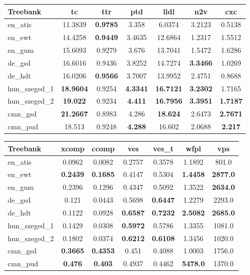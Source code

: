 \begin{table*}
\centering
\begin{tabularx}{\textwidth}{Xcccccc}
\hline
\textbf{Treebank} & \textbf{tc} & \textbf{ttr} & \textbf{ptd} & \textbf{lldl} & \textbf{n2v} & \textbf{cxc} \\
\hline
en\_atis & 11.3839 & \textbf{0.9785} & 3.358 & 6.0374 & 3.2123 & 0.5138 \\
\hline
en\_ewt & 14.4258 & \textbf{0.9449} & 3.4635 & 12.6864 & 1.2317 & 1.5512 \\
\hline
en\_gum & 15.6093 & 0.9279 & 3.676 & 13.7041 & 1.5472 & 1.6286 \\
\hline
de\_gsd & 16.6016 & 0.9436 & 3.8252 & 14.7274 & \textbf{3.3466} & 1.0269 \\
\hline
de\_hdt & 16.0206 & \textbf{0.9566} & 3.7007 & 13.9952 & 2.4751 & 0.8688 \\
\hline
hun\_szeged\_1 & \textbf{18.9604} & 0.9254 & \textbf{4.3341} & \textbf{16.7121} & \textbf{3.2302} & 1.7165 \\
\hline
hun\_szeged\_2 & \textbf{19.022} & 0.9234 & \textbf{4.411} & \textbf{16.7956} & \textbf{3.3951} & \textbf{1.7187} \\
\hline
cmn\_gsd & \textbf{21.2667} & 0.8983 & 4.286 & \textbf{18.624} & 2.6473 & \textbf{2.7671} \\
\hline
cmn\_pud & 18.513 & 0.9248 & \textbf{4.288} & 16.602 & 2.0688 & \textbf{2.217} \\
\hline
\end{tabularx}

\vspace{0.5cm}

\begin{tabularx}{\textwidth}{Xcccccc}
\hline
\textbf{Treebank} & \textbf{xcomp} & \textbf{ccomp} & \textbf{ves} & \textbf{ves\_t} & \textbf{wfpl} & \textbf{vps} \\
\hline
en\_atis & 0.0962 & 0.0082 & 0.2757 & 0.3578 & 1.1892 & 801.0 \\
\hline
en\_ewt & \textbf{0.2439} & \textbf{0.1685} & 0.4147 & 0.5304 & \textbf{1.4458} & \textbf{2877.0} \\
\hline
en\_gum & 0.2396 & 0.1296 & 0.4347 & 0.5092 & 1.3522 & \textbf{2634.0} \\
\hline
de\_gsd & 0.121 & 0.0443 & 0.5698 & \textbf{0.6447} & 1.2279 & 2293.0 \\
\hline
de\_hdt & 0.1122 & 0.0928 & \textbf{0.6587} & \textbf{0.7232} & \textbf{2.5082} & \textbf{2685.0} \\
\hline
hun\_szeged\_1 & 0.1429 & 0.0308 & \textbf{0.5972} & 0.5786 & 1.3355 & 1081.0 \\
\hline
hun\_szeged\_2 & 0.1802 & 0.0374 & \textbf{0.6212} & \textbf{0.6108} & 1.3456 & 1020.0 \\
\hline
cmn\_gsd & \textbf{0.3665} & \textbf{0.4353} & 0.451 & 0.4088 & 1.0003 & 1756.0 \\
\hline
cmn\_pud & \textbf{0.476} & \textbf{0.403} & 0.4937 & 0.4462 & \textbf{5478.0} & 1370.0 \\
\hline
\end{tabularx}
\caption{Results on official UD treebanks. Top 3 values are highlighted for each metric.}
\label{tab:results}
\end{table*}